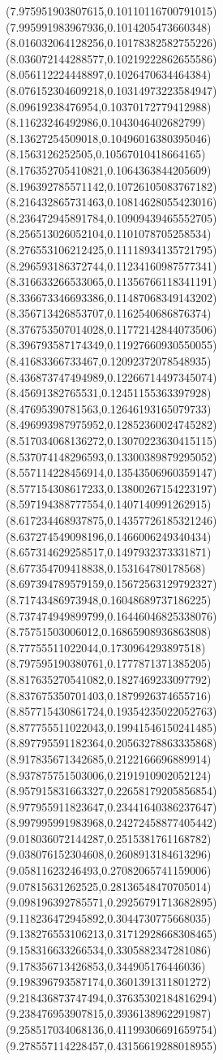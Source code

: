 {(7.975951903807615,0.10110116700791015)
(7.995991983967936,0.1014205473660348)
(8.016032064128256,0.10178382582755226)
(8.036072144288577,0.10219222862655586)
(8.056112224448897,0.1026470634464384)
(8.076152304609218,0.10314973223584947)
(8.09619238476954,0.10370172779412988)
(8.11623246492986,0.1043046402682799)
(8.13627254509018,0.10496016380395046)
(8.1563126252505,0.10567010418664165)
(8.176352705410821,0.1064363844205609)
(8.196392785571142,0.10726105083767182)
(8.216432865731463,0.10814628055423016)
(8.236472945891784,0.10909439465552705)
(8.256513026052104,0.1101078705258534)
(8.276553106212425,0.11118934135721795)
(8.296593186372744,0.11234160987577341)
(8.316633266533065,0.11356766118341191)
(8.336673346693386,0.11487068349143202)
(8.356713426853707,0.1162540686876374)
(8.376753507014028,0.11772142844073506)
(8.396793587174349,0.11927660930550055)
(8.41683366733467,0.12092372078548935)
(8.436873747494989,0.12266714497345074)
(8.45691382765531,0.12451155363397928)
(8.47695390781563,0.12646193165079733)
(8.496993987975952,0.12852360024745282)
(8.517034068136272,0.13070223630415115)
(8.537074148296593,0.13300389879295052)
(8.557114228456914,0.13543506960359147)
(8.577154308617233,0.13800267154223197)
(8.597194388777554,0.1407140991262915)
(8.617234468937875,0.14357726185321246)
(8.637274549098196,0.1466006249340434)
(8.657314629258517,0.1497932373331871)
(8.677354709418838,0.153164780178568)
(8.697394789579159,0.15672563129792327)
(8.71743486973948,0.16048689737186225)
(8.737474949899799,0.16446046825338076)
(8.75751503006012,0.16865908936863808)
(8.77755511022044,0.1730964293897518)
(8.797595190380761,0.1777871371385205)
(8.817635270541082,0.1827469233097792)
(8.837675350701403,0.1879926374655716)
(8.857715430861724,0.19354235022052763)
(8.877755511022043,0.19941546150241485)
(8.897795591182364,0.20563278863335868)
(8.917835671342685,0.2122166696889914)
(8.937875751503006,0.2191910902052124)
(8.957915831663327,0.22658179205856854)
(8.977955911823647,0.23441640386237647)
(8.997995991983968,0.24272458877405442)
(9.018036072144287,0.2515381761168782)
(9.038076152304608,0.2608913184613296)
(9.05811623246493,0.27082065741159006)
(9.07815631262525,0.28136548470705014)
(9.098196392785571,0.29256791713682895)
(9.118236472945892,0.3044730775668035)
(9.138276553106213,0.31712928668308465)
(9.158316633266534,0.3305882347281086)
(9.178356713426853,0.344905176446036)
(9.198396793587174,0.3601391311801272)
(9.218436873747494,0.37635302184816294)
(9.238476953907815,0.3936138962291987)
(9.258517034068136,0.41199306691659754)
(9.278557114228457,0.43156619288018955)
}

